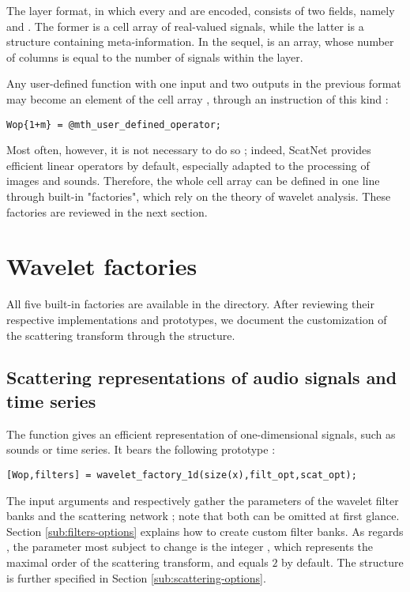 \documentclass{article}
\begin{document}
The layer format, in which every  and  are encoded, consists of two fields, namely  and . The former is a cell array of real-valued signals, while the latter is a structure containing meta-information. In the sequel,  is an array, whose number of columns is equal to the number of signals within the layer.

Any user-defined function with one input and two outputs in the previous format may become an element of the cell array , through an instruction of this kind :

\begin{lstlisting}
Wop{1+m} = @mth_user_defined_operator;
\end{lstlisting}

Most often, however, it is not necessary to do so ; indeed, ScatNet provides efficient linear operators by default, especially adapted to the processing of images and sounds. Therefore, the whole cell array  can be defined in one line through built-in "factories", which rely on the theory of wavelet analysis. These factories are reviewed in the next section.


\section{Wavelet factories \label{sec:wavelet-factories}}
All five built-in factories are available in the  directory. After reviewing their respective implementations and prototypes, we document the customization of the scattering transform through the  structure.

\subsection{Scattering representations of audio signals and time series \label{sec:wavelet-factory-1d}}
The function  gives an efficient representation of one-dimensional signals, such as sounds or time series. It bears the following prototype :

\begin{lstlisting}
[Wop,filters] = wavelet_factory_1d(size(x),filt_opt,scat_opt);
\end{lstlisting}

The input arguments  and  respectively gather the parameters of the wavelet filter banks and the scattering network ; note that both can be omitted at first glance. Section \ref{sub:filters-options} explains how to create custom filter banks. As regards , the parameter most subject to change is the integer , which represents the maximal order of the scattering transform, and equals $2$ by default. The  structure is further specified in Section \ref{sub:scattering-options}.
\end{document}
